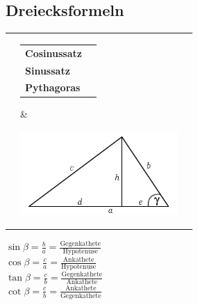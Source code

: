 \subsection{Dreiecksformeln}
\begin{tabular}{lll}
	& \parbox{9.5cm}{
		\begin{tabular}{lr}
			\textbf{Cosinussatz} &
			$\displaystyle c^2 = a^2 + b^2 - 2 \cdot a \cdot b \cdot \cos \gamma$ \\
			\textbf{Sinussatz} &
			$\displaystyle \frac{a}{\sin \alpha} = \frac{b}{\sin \beta} = \frac{c}{\sin \gamma} = 2r =
			\frac{u}{\pi}$ \\
			\textbf{Pythagoras} &
			$\displaystyle \sin^2(b)+\cos^2(b)=1 \qquad \tan(b)=\frac{\sin(b)}{\cos(b)}$
		\end{tabular}
		}

	& \parbox{8cm}{
		\includegraphics[width=6cm]{./idiotenseite/images/cosinussatz.png}}
\end{tabular}
\begin{center}
	\begin{multicols}{2}
		$\sin \beta = \frac ba =\frac{\text{Gegenkathete}}{\text{Hypotenuse}}$\\
		$\cos \beta = \frac ca =\frac{\text{Ankathete}}{\text{Hypotenuse}}$\\
		$\tan \beta = \frac cb =\frac{\text{Gegenkathete}}{\text{Ankathete}}$\\
		$\cot \beta = \frac cb =\frac{\text{Ankathete}}{\text{Gegenkathete}}$\\
	\end{multicols}
\end{center}
